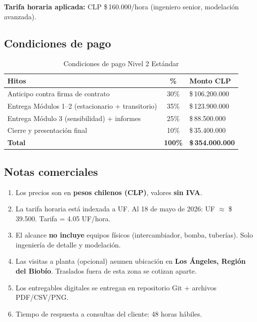 \documentclass[11pt,a4paper]{article}
\begin{document}
\textbf{Tarifa horaria aplicada:} CLP \$\,160.000/hora (ingeniero senior, modelación avanzada).

\subsection{Condiciones de pago}

\begin{table}[H]
\centering
\caption{Condiciones de pago Nivel 2 Estándar}
\begin{tabular}{@{}lcl@{}}
\toprule
\textbf{Hitos} & \textbf{\%} & \textbf{Monto CLP} \\
\midrule
Anticipo contra firma de contrato & 30\% & \$\,106.200.000 \\
Entrega Módulos 1--2 (estacionario + transitorio) & 35\% & \$\,123.900.000 \\
Entrega Módulo 3 (sensibilidad) + informes & 25\% & \$\,88.500.000 \\
Cierre y presentación final & 10\% & \$\,35.400.000 \\
\midrule
\textbf{Total} & \textbf{100\%} & \textbf{\$\,354.000.000} \\
\bottomrule
\end{tabular}
\end{table}

\subsection{Notas comerciales}

\begin{enumerate}
  \item Los precios son en \textbf{pesos chilenos (CLP)}, valores \textbf{sin IVA}.
  \item La tarifa horaria está indexada a UF. Al 18 de mayo de 2026: UF $\approx$ \$\,39.500. Tarifa = 4.05 UF/hora.
  \item El alcance \textbf{no incluye} equipos físicos (intercambiador, bomba, tuberías). Solo ingeniería de detalle y modelación.
  \item Las visitas a planta (opcional) asumen ubicación en \textbf{Los Ángeles, Región del Biobío}. Traslados fuera de esta zona se cotizan aparte.
  \item Los entregables digitales se entregan en repositorio Git + archivos PDF/CSV/PNG.
  \item Tiempo de respuesta a consultas del cliente: 48 horas hábiles.
\end{enumerate}
\end{document}
